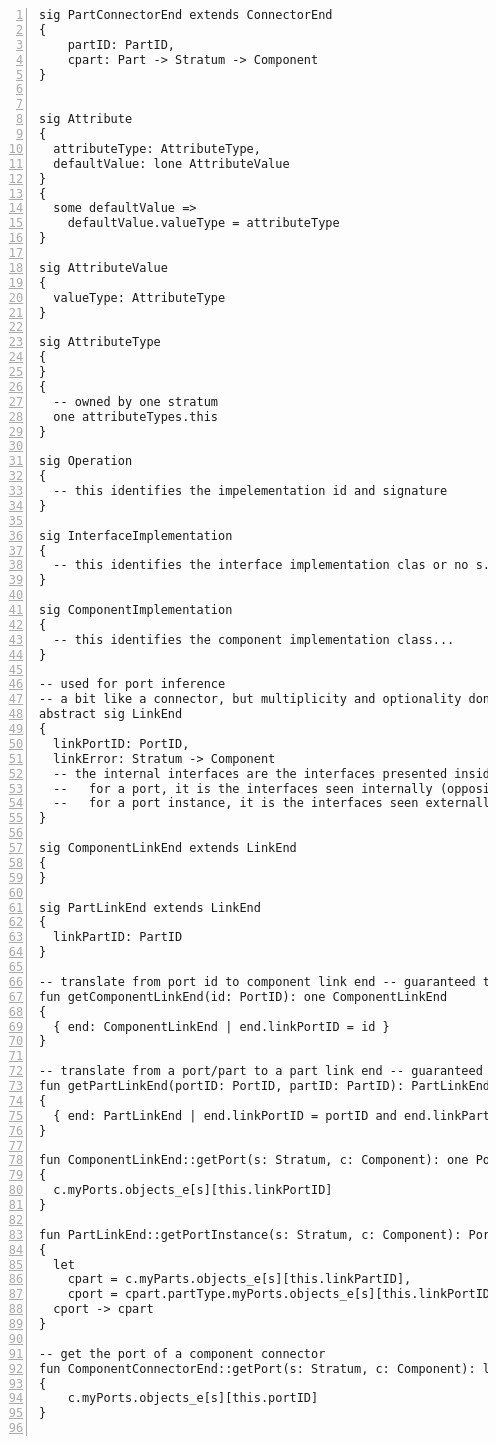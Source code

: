 \begin{lstlisting}[caption={structure.als}, numbers=left]
sig PartConnectorEnd extends ConnectorEnd
{
    partID: PartID,
    cpart: Part -> Stratum -> Component
}


sig Attribute
{
  attributeType: AttributeType,
  defaultValue: lone AttributeValue
}
{
  some defaultValue =>
    defaultValue.valueType = attributeType
}

sig AttributeValue
{
  valueType: AttributeType
}

sig AttributeType
{
}
{
  -- owned by one stratum
  one attributeTypes.this
}

sig Operation
{
  -- this identifies the impelementation id and signature
}

sig InterfaceImplementation
{
  -- this identifies the interface implementation clas or no s.dependsOns...
}

sig ComponentImplementation
{
  -- this identifies the component implementation class...
}

-- used for port inference
-- a bit like a connector, but multiplicity and optionality don't count
abstract sig LinkEnd
{
  linkPortID: PortID,
  linkError: Stratum -> Component
  -- the internal interfaces are the interfaces presented inside the component content area
  --   for a port, it is the interfaces seen internally (opposite)
  --   for a port instance, it is the interfaces seen externally (same)
}

sig ComponentLinkEnd extends LinkEnd
{
}

sig PartLinkEnd extends LinkEnd
{
  linkPartID: PartID
}

-- translate from port id to component link end -- guaranteed to be 1 per id
fun getComponentLinkEnd(id: PortID): one ComponentLinkEnd
{
  { end: ComponentLinkEnd | end.linkPortID = id }
}

-- translate from a port/part to a part link end -- guaranteed to be 1 per pair
fun getPartLinkEnd(portID: PortID, partID: PartID): PartLinkEnd
{
  { end: PartLinkEnd | end.linkPortID = portID and end.linkPartID = partID }
}

fun ComponentLinkEnd::getPort(s: Stratum, c: Component): one Port
{
  c.myPorts.objects_e[s][this.linkPortID]
}

fun PartLinkEnd::getPortInstance(s: Stratum, c: Component): Port -> Part
{
  let
    cpart = c.myParts.objects_e[s][this.linkPartID],
    cport = cpart.partType.myPorts.objects_e[s][this.linkPortID] |
  cport -> cpart
}

-- get the port of a component connector
fun ComponentConnectorEnd::getPort(s: Stratum, c: Component): lone Port
{
    c.myPorts.objects_e[s][this.portID]
}


\end{lstlisting}
